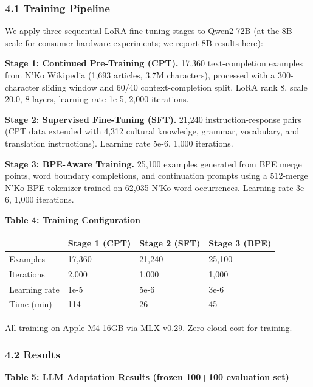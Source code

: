 \documentclass[
]{article}
\newcounter{none} %
\begin{document}
\subsubsection{4.1 Training Pipeline}\label{training-pipeline}

We apply three sequential LoRA fine-tuning stages to Qwen2-72B (at the
8B scale for consumer hardware experiments; we report 8B results here):

\textbf{Stage 1: Continued Pre-Training (CPT).} 17,360 text-completion
examples from N'Ko Wikipedia (1,693 articles, 3.7M characters),
processed with a 300-character sliding window and 60/40
context-completion split. LoRA rank 8, scale 20.0, 8 layers, learning
rate 1e-5, 2,000 iterations.

\textbf{Stage 2: Supervised Fine-Tuning (SFT).} 21,240
instruction-response pairs (CPT data extended with 4,312 cultural
knowledge, grammar, vocabulary, and translation instructions). Learning
rate 5e-6, 1,000 iterations.

\textbf{Stage 3: BPE-Aware Training.} 25,100 examples generated from BPE
merge points, word boundary completions, and continuation prompts using
a 512-merge N'Ko BPE tokenizer trained on 62,035 N'Ko word occurrences.
Learning rate 3e-6, 1,000 iterations.

\textbf{Table 4: Training Configuration}

{\def\LTcaptype{none} %
\begin{longtable}[]{@{}llll@{}}
\toprule\noalign{}
& Stage 1 (CPT) & Stage 2 (SFT) & Stage 3 (BPE) \\
\midrule\noalign{}
\endhead
\bottomrule\noalign{}
\endlastfoot
Examples & 17,360 & 21,240 & 25,100 \\
Iterations & 2,000 & 1,000 & 1,000 \\
Learning rate & 1e-5 & 5e-6 & 3e-6 \\
Time (min) & 114 & 26 & 45 \\
\end{longtable}
}

All training on Apple M4 16GB via MLX v0.29. Zero cloud cost for
training.

\subsubsection{4.2 Results}\label{results}

\textbf{Table 5: LLM Adaptation Results (frozen 100+100 evaluation set)}
\end{document}
